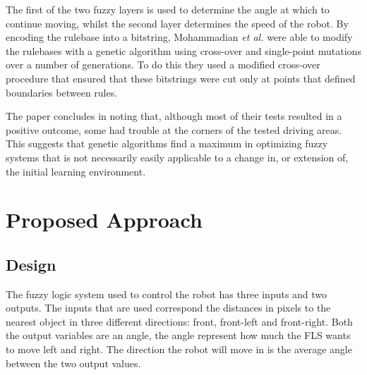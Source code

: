 \documentclass[conference]{IEEEtran}
\begin{document}
The first of the two fuzzy layers is used to determine the angle at which to continue moving, whilst the second layer determines the speed of the robot. By encoding the rulebase into a bitstring, Mohammadian \textit{et al.}\cite{mohammadian1995adaptive} were able to modify the rulebases with a genetic algorithm using cross-over and single-point mutations over a number of generations. To do this they used a modified cross-over procedure that ensured that these bitstrings were cut only at points that defined boundaries between rules.

The paper concludes in noting that, although most of their tests resulted in a positive outcome, some had trouble at the corners of the tested driving areas. This suggests that genetic algorithms find a maximum in optimizing fuzzy systems that is not necessarily easily applicable to a change in, or extension of, the initial learning environment.

\section{Proposed Approach}
\subsection{Design}
The fuzzy logic system used to control the robot has three inputs and two outputs. The inputs that are used correspond the distances in pixels to the nearest object in three different directions: front, front-left and front-right. Both the output variables are an angle, the angle represent how much the FLS wants to move left and right. The direction the robot will move in is the average angle between the two output values.
\end{document}
